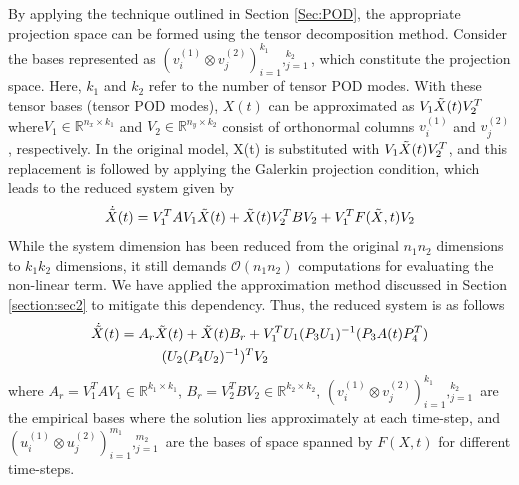 \documentclass{article}
\begin{document}
 
 By applying the technique outlined in Section \ref{Sec:POD}, the appropriate projection space can be formed using the tensor decomposition method.
 Consider the bases represented as  $(v^{(1)}_i \otimes v^{(2)}_j)_{i=1}^{k_1},_{j=1}^{k_2}$, which constitute the projection space. Here, $k_1$ and $k_2$ refer to the number of tensor POD modes. With these tensor bases (tensor POD modes), $X(t)$ can be approximated as $V_1\Tilde{X}(t)V_2^T$ where$V_1 \in \mathbb{R}^{n_x \times k_1}$ and $V_2 \in \mathbb{R}^{n_y \times k_2}$ consist of orthonormal columns $v^{(1)}_i$ and $v^{(2)}_j$, respectively.
 In the original model, X(t) is substituted with $V_1\Tilde{X}(t)V_2^T$, and this replacement is followed by applying the Galerkin projection condition, which leads to the reduced system given by
 \begin{equation*}
     \Dot{\Tilde{X}}(t)=V_1^TAV_1\Tilde{X}(t)+\Tilde{X}(t)V_2^TBV_2+V_1^TF(\Tilde{X},t)V_2
\end{equation*}
While the system dimension has been reduced from the original $n_1n_2$ dimensions to $k_1k_2$ dimensions, it still demands $\mathcal{O}(n_1n_2)$ computations for evaluating the non-linear term. We have applied the approximation method discussed in Section \ref{section:sec2} to mitigate this dependency. Thus, the reduced system is as follows
\begin{equation}\label{eqn5667}
\begin{split}
    \Dot{\Tilde{X}}(t)&=A_r\Tilde{X}(t)+\Tilde{X}(t)B_r+V_1^TU_1(P_3U_1)^{-1}(P_3A(t)P_4^T)\\
        & \quad \quad \quad (U_2(P_4U_2)^{-1})^TV_2
\end{split}
\end{equation}
where $A_r=V_1^TAV_1 \in \mathbb{R}^{k_1 \times k_1}$, $B_r=V_2^TBV_2 \in \mathbb{R}^{k_2 \times k_2}$, $(v^{(1)}_i \otimes v^{(2)}_j)_{i=1}^{k_1},_{j=1}^{k_2}$ are the empirical bases where the solution lies approximately at each time-step, and $(u^{(1)}_i \otimes u^{(2)}_j)_{i=1}^{m_1},_{j=1}^{m_2}$ are the bases of space spanned by $F(X,t)$ for different time-steps.
\end{document}

